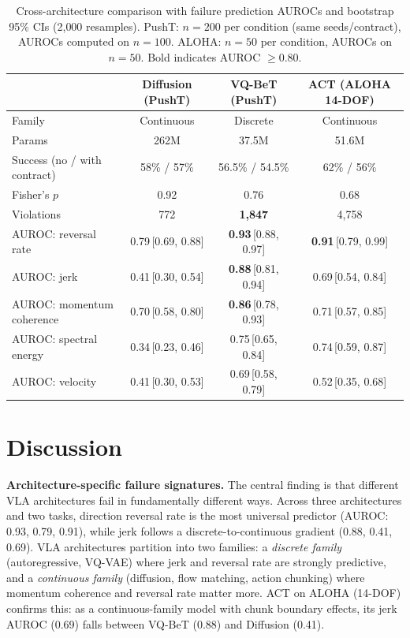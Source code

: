 \documentclass[conference]{IEEEtran}
\begin{document}
\begin{table}[t]
\centering
\caption{Cross-architecture comparison with failure prediction AUROCs and bootstrap 95\% CIs (2{,}000 resamples). PushT: $n{=}200$ per condition (same seeds/contract), AUROCs computed on $n{=}100$. ALOHA: $n{=}50$ per condition, AUROCs on $n{=}50$. Bold indicates AUROC $\ge 0.80$.}
\label{tab:crossarch}
\small
\begin{tabular}{lccc}
\toprule
 & \textbf{Diffusion (PushT)} & \textbf{VQ-BeT (PushT)} & \textbf{ACT (ALOHA 14-DOF)} \\
\midrule
Family & Continuous & Discrete & Continuous \\
Params & 262M & 37.5M & 51.6M \\
Success (no / with contract) & 58\% / 57\% & 56.5\% / 54.5\% & 62\% / 56\% \\
Fisher's $p$ & 0.92 & 0.76 & 0.68 \\
Violations & 772 & \textbf{1{,}847} & 4{,}758 \\
\midrule
AUROC: reversal rate & 0.79\,[0.69, 0.88] & \textbf{0.93}\,[0.88, 0.97] & \textbf{0.91}\,[0.79, 0.99] \\
AUROC: jerk & 0.41\,[0.30, 0.54] & \textbf{0.88}\,[0.81, 0.94] & 0.69\,[0.54, 0.84] \\
AUROC: momentum coherence & 0.70\,[0.58, 0.80] & \textbf{0.86}\,[0.78, 0.93] & 0.71\,[0.57, 0.85] \\
AUROC: spectral energy & 0.34\,[0.23, 0.46] & 0.75\,[0.65, 0.84] & 0.74\,[0.59, 0.87] \\
AUROC: velocity & 0.41\,[0.30, 0.53] & 0.69\,[0.58, 0.79] & 0.52\,[0.35, 0.68] \\
\bottomrule
\end{tabular}
\end{table}

\section{Discussion}

\textbf{Architecture-specific failure signatures.}
The central finding is that different VLA architectures fail in fundamentally different ways.
Across three architectures and two tasks, direction reversal rate is the most universal predictor (AUROC: 0.93, 0.79, 0.91), while jerk follows a discrete-to-continuous gradient (0.88, 0.41, 0.69).
VLA architectures partition into two families: a \emph{discrete family} (autoregressive, VQ-VAE) where jerk and reversal rate are strongly predictive, and a \emph{continuous family} (diffusion, flow matching, action chunking) where momentum coherence and reversal rate matter more.
ACT on ALOHA (14-DOF) confirms this: as a continuous-family model with chunk boundary effects, its jerk AUROC (0.69) falls between VQ-BeT (0.88) and Diffusion (0.41).
\end{document}
